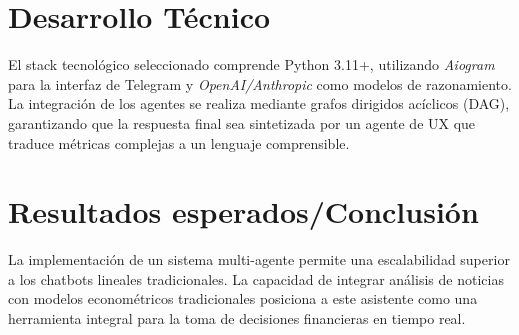 \documentclass[10pt]{article}
\begin{document}
\section{Desarrollo Técnico}
El stack tecnológico seleccionado comprende Python 3.11+, utilizando \textit{Aiogram} para la interfaz de Telegram y \textit{OpenAI/Anthropic} como modelos de razonamiento. La integración de los agentes se realiza mediante grafos dirigidos acíclicos (DAG), garantizando que la respuesta final sea sintetizada por un agente de UX que traduce métricas complejas a un lenguaje comprensible.

\section{Resultados esperados/Conclusión}
La implementación de un sistema multi-agente permite una escalabilidad superior a los chatbots lineales tradicionales. La capacidad de integrar análisis de noticias con modelos econométricos tradicionales posiciona a este asistente como una herramienta integral para la toma de decisiones financieras en tiempo real.
\end{document}
